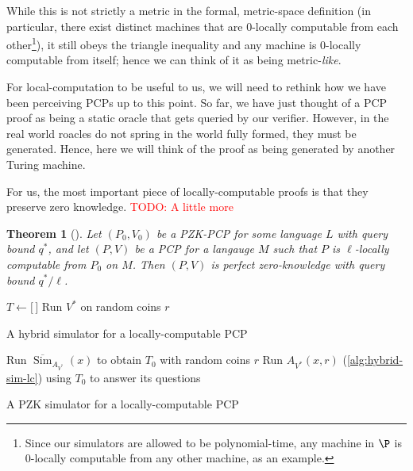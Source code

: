 \documentclass[english,12pt]{reedthesis}
\theoremstyle{plain}
\newtheorem{thm}{Theorem}[section]
\theoremstyle{definition}
\theoremstyle{remark}
\DeclareMathOperator{\Sim}{Sim}
\newcommand{\TODO}[1]{\textcolor{red}{TODO: #1}}
\begin{document}
While this is not strictly a metric in the formal, metric-space definition (in
particular, there exist distinct machines that are $0$-locally computable from
each other\footnote{Since our simulators are allowed to be polynomial-time, any
  machine in $\P$ is $0$-locally computable from any other machine, as an
  example.}), it still obeys the triangle inequality and any machine is
$0$-locally computable from itself; hence we can think of it as being
metric-\emph{like}.

For local-computation to be useful to us, we will need to rethink how we have
been perceiving PCPs up to this point. So far, we have just thought of a PCP
proof as being a static oracle that gets queried by our verifier. However, in
the real world roacles do not spring in the world fully formed, they must be
generated. Hence, here we will think of the proof as being generated by another
Turing machine.

For us, the most important piece of locally-computable proofs is that they
preserve zero knowledge. \TODO{A little more}

\begin{thm}[{\cite[Lemma 3.2]{GOS25}}]\label{thm:local-comp-pzk}
  Let $(P_{0}, V_{0})$ be a PZK-PCP for some language $L$ with query bound
  $q^{*}$, and let $(P, V)$ be a PCP for a langauge $M$ such that $P$ is
  $\ell$-locally computable from $P_{0}$ on $M$. Then $(P, V)$ is perfect
  zero-knowledge with query bound $q^{*}/\ell$.
\end{thm}

\begin{algorithm}[htbp]
  $T \leftarrow \lbrack\,\rbrack$\;
  Run $V^{*}$ on random coins $r$\;
  \;
  \caption{A hybrid simulator for a locally-computable PCP~\cite[Construction
    3.3]{GOS25}}\label{alg:hybrid-sim-lc}
\end{algorithm}

\begin{algorithm}[htbp]
  Run $\overline{\Sim}_{A_{V^{*}}}(x)$ to obtain $T_{0}$ with random coins $r$\;
  Run $A_{V^{*}}(x, r)$ (\cref{alg:hybrid-sim-lc}) using $T_{0}$ to answer its
  questions\;
  \;
  \caption{A PZK simulator for a locally-computable PCP~\cite[Construction
    3.4]{GOS25}}\label{alg:pzk-sim-lc}
\end{algorithm}
\end{document}
